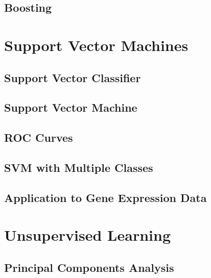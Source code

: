 \documentclass[
]{book}
\begin{document}
\hypertarget{boosting}{%
\section{Boosting}\label{boosting}}

\hypertarget{support-vector-machines}{%
\chapter{Support Vector Machines}\label{support-vector-machines}}

\hypertarget{support-vector-classifier}{%
\section{Support Vector Classifier}\label{support-vector-classifier}}

\hypertarget{support-vector-machine}{%
\section{Support Vector Machine}\label{support-vector-machine}}

\hypertarget{roc-curves}{%
\section{ROC Curves}\label{roc-curves}}

\hypertarget{svm-with-multiple-classes}{%
\section{SVM with Multiple Classes}\label{svm-with-multiple-classes}}

\hypertarget{application-to-gene-expression-data}{%
\section{Application to Gene Expression Data}\label{application-to-gene-expression-data}}

\hypertarget{unsupervised-learning}{%
\chapter{Unsupervised Learning}\label{unsupervised-learning}}

\hypertarget{principal-components-analysis}{%
\section{Principal Components Analysis}\label{principal-components-analysis}}
\end{document}

